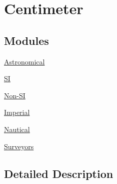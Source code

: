 \hypertarget{group___e_g_x_math-_conversions-_length_conversions-_centimeter}{}\section{Centimeter}
\label{group___e_g_x_math-_conversions-_length_conversions-_centimeter}
\subsection*{Modules}
\begin{DoxyCompactItemize}
\item 
\mbox{\hyperlink{group___e_g_x_math-_conversions-_length_conversions-_centimeter-_astronomical}{Astronomical}}
\item 
\mbox{\hyperlink{group___e_g_x_math-_conversions-_length_conversions-_centimeter-_s_i}{SI}}
\item 
\mbox{\hyperlink{group___e_g_x_math-_conversions-_length_conversions-_centimeter-_non-_s_i}{Non-\/\+SI}}
\item 
\mbox{\hyperlink{group___e_g_x_math-_conversions-_length_conversions-_centimeter-_imperial}{Imperial}}
\item 
\mbox{\hyperlink{group___e_g_x_math-_conversions-_length_conversions-_centimeter-_nautical}{Nautical}}
\item 
\mbox{\hyperlink{group___e_g_x_math-_conversions-_length_conversions-_centimeter-_surveyors}{Surveyors}}
\end{DoxyCompactItemize}


\subsection{Detailed Description}

